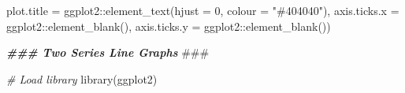 \documentclass[
]{book}
\newenvironment{Shaded}{\begin{snugshade}}{\end{snugshade}}
\newcommand{\AlertTok}[1]{\textcolor[rgb]{0.94,0.16,0.16}{#1}}
\newcommand{\AttributeTok}[1]{\textcolor[rgb]{0.77,0.63,0.00}{#1}}
\newcommand{\CommentTok}[1]{\textcolor[rgb]{0.56,0.35,0.01}{\textit{#1}}}
\newcommand{\DecValTok}[1]{\textcolor[rgb]{0.00,0.00,0.81}{#1}}
\newcommand{\DocumentationTok}[1]{\textcolor[rgb]{0.56,0.35,0.01}{\textbf{\textit{#1}}}}
\newcommand{\FunctionTok}[1]{\textcolor[rgb]{0.00,0.00,0.00}{#1}}
\newcommand{\NormalTok}[1]{#1}
\newcommand{\SpecialCharTok}[1]{\textcolor[rgb]{0.00,0.00,0.00}{#1}}
\newcommand{\StringTok}[1]{\textcolor[rgb]{0.31,0.60,0.02}{#1}}
\begin{document}
\begin{Shaded}
\begin{Highlighting}[]
               \AttributeTok{plot.title =}\NormalTok{ ggplot2}\SpecialCharTok{::}\FunctionTok{element\_text}\NormalTok{(}\AttributeTok{hjust =} \DecValTok{0}\NormalTok{, }\AttributeTok{colour =} \StringTok{"\#404040"}\NormalTok{),}
               \AttributeTok{axis.ticks.x =}\NormalTok{ ggplot2}\SpecialCharTok{::}\FunctionTok{element\_blank}\NormalTok{(),}
               \AttributeTok{axis.ticks.y =}\NormalTok{ ggplot2}\SpecialCharTok{::}\FunctionTok{element\_blank}\NormalTok{())}
\end{Highlighting}
\end{Shaded}

\begin{Shaded}
\begin{Highlighting}[]
\DocumentationTok{\#\#\# Two Series Line Graphs }\AlertTok{\#\#\#}

\CommentTok{\# Load library}
\FunctionTok{library}\NormalTok{(ggplot2)}


\end{Highlighting}
\end{Shaded}
\end{document}
